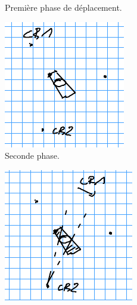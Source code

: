 \documentclass[english,RandD]{rapportPFE}  %
\begin{document}
\begin{figure}[h!]
\begin{subfigure}[t]{0.3\linewidth}
						\caption{Première phase de déplacement.}
						\label{fig:triangle_2}
					\end{subfigure}
					\hfill
					\begin{subfigure}[t]{0.3\linewidth}
						\centering
						\includegraphics[width=\linewidth]{graphics/triangle_3.png}
						\caption{Seconde phase.}
						\label{fig:triangle_3}
					\end{subfigure}
					\hfill
					\begin{subfigure}[t]{0.3\linewidth}
						\centering
						\includegraphics[width=\linewidth]{graphics/triangle_4.png}

\end{subfigure}
\end{figure}
\end{document}
